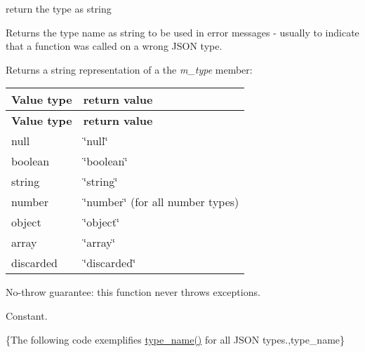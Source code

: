 return the type as string 

Returns the type name as string to be used in error messages -\/ usually to indicate that a function was called on a wrong J\+S\+ON type.

\begin{DoxyReturn}{Returns}
a string representation of a the {\itshape m\+\_\+type} member\+: \tabulinesep=1mm
\begin{longtabu} spread 0pt [c]{*{2}{|X[-1]}|}
\hline
\rowcolor{\tableheadbgcolor}\textbf{ Value type  }&\textbf{ return value   }\\
\endfirsthead
\hline
\endfoot
\hline
\rowcolor{\tableheadbgcolor}\textbf{ Value type  }&\textbf{ return value   }\\
\endhead
null  &{\ttfamily \char`\"{}null\char`\"{}}   \\
boolean  &{\ttfamily \char`\"{}boolean\char`\"{}}   \\
string  &{\ttfamily \char`\"{}string\char`\"{}}   \\
number  &{\ttfamily \char`\"{}number\char`\"{}} (for all number types)   \\
object  &{\ttfamily \char`\"{}object\char`\"{}}   \\
array  &{\ttfamily \char`\"{}array\char`\"{}}   \\
discarded  &{\ttfamily \char`\"{}discarded\char`\"{}}   \\
\end{longtabu}

\end{DoxyReturn}
No-\/throw guarantee\+: this function never throws exceptions.

Constant.

\{The following code exemplifies {\ttfamily \mbox{\hyperlink{classnlohmann_1_1basic__json_a9d0a478571f82f0163b96b2424cd998f}{type\+\_\+name()}}} for all J\+S\+ON types.,type\+\_\+name\}

